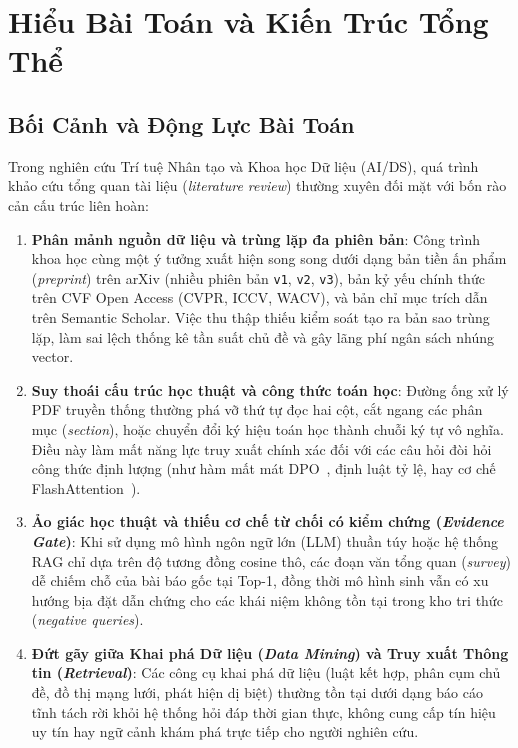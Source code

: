 \chapter{Hiểu Bài Toán và Kiến Trúc Tổng Thể}
\label{chap:business_understanding}

\section{Bối Cảnh và Động Lực Bài Toán}
\label{sec:ch1_context}

Trong nghiên cứu Trí tuệ Nhân tạo và Khoa học Dữ liệu (AI/DS), quá trình khảo cứu tổng quan tài liệu (\textit{literature review}) thường xuyên đối mặt với bốn rào cản cấu trúc liên hoàn:
\begin{enumerate}[label=\textbf{\arabic*.}]
  \item \textbf{Phân mảnh nguồn dữ liệu và trùng lặp đa phiên bản}: Công trình khoa học cùng một ý tưởng xuất hiện song song dưới dạng bản tiền ấn phẩm (\textit{preprint}) trên arXiv (nhiều phiên bản \texttt{v1}, \texttt{v2}, \texttt{v3}), bản kỷ yếu chính thức trên CVF Open Access (CVPR, ICCV, WACV), và bản chỉ mục trích dẫn trên Semantic Scholar. Việc thu thập thiếu kiểm soát tạo ra bản sao trùng lặp, làm sai lệch thống kê tần suất chủ đề và gây lãng phí ngân sách nhúng vector.
  \item \textbf{Suy thoái cấu trúc học thuật và công thức toán học}: Đường ống xử lý PDF truyền thống thường phá vỡ thứ tự đọc hai cột, cắt ngang các phân mục (\textit{section}), hoặc chuyển đổi ký hiệu toán học thành chuỗi ký tự vô nghĩa. Điều này làm mất năng lực truy xuất chính xác đối với các câu hỏi đòi hỏi công thức định lượng (như hàm mất mát DPO~\cite{rafailov2023direct}, định luật tỷ lệ, hay cơ chế FlashAttention~\cite{dao2022flashattention}).
  \item \textbf{Ảo giác học thuật và thiếu cơ chế từ chối có kiểm chứng (\textit{Evidence Gate})}: Khi sử dụng mô hình ngôn ngữ lớn (LLM) thuần túy hoặc hệ thống RAG chỉ dựa trên độ tương đồng cosine thô, các đoạn văn tổng quan (\textit{survey}) dễ chiếm chỗ của bài báo gốc tại Top-1, đồng thời mô hình sinh vẫn có xu hướng bịa đặt dẫn chứng cho các khái niệm không tồn tại trong kho tri thức (\textit{negative queries}).
  \item \textbf{Đứt gãy giữa Khai phá Dữ liệu (\textit{Data Mining}) và Truy xuất Thông tin (\textit{Retrieval})}: Các công cụ khai phá dữ liệu (luật kết hợp, phân cụm chủ đề, đồ thị mạng lưới, phát hiện dị biệt) thường tồn tại dưới dạng báo cáo tĩnh tách rời khỏi hệ thống hỏi đáp thời gian thực, không cung cấp tín hiệu uy tín hay ngữ cảnh khám phá trực tiếp cho người nghiên cứu.
\end{enumerate}


